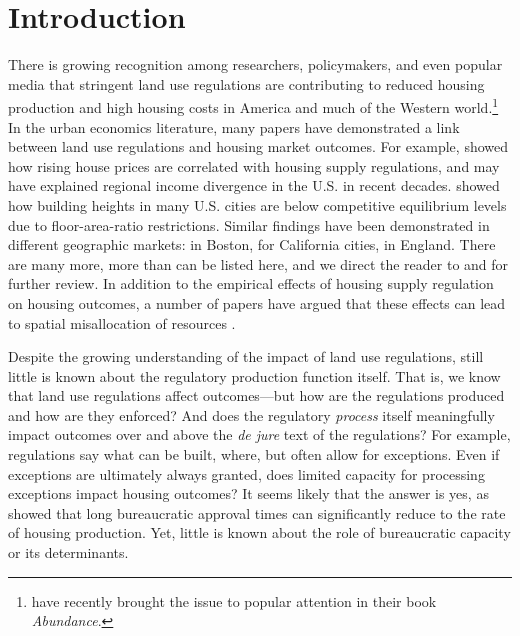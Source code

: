 \section{Introduction}\label{sec_intro}

There is growing recognition among researchers, policymakers, and even popular media that stringent land use regulations are contributing to reduced housing production and high housing costs in America and much of the Western world.\footnote{\citet{klein2025abundance} have recently brought the issue to popular attention in their book \emph{Abundance}.} In the urban economics literature, many papers have demonstrated a link between land use regulations and housing market outcomes. For example, \citet{ganongshoag2017} showed how rising house prices are correlated with housing supply regulations, and may have explained regional income divergence in the U.S. in recent decades. \citet{brueckner2020} showed how building heights in many U.S. cities are below competitive equilibrium levels due to floor-area-ratio restrictions. Similar findings have been demonstrated in different geographic markets: \citet{glaeser2009} in Boston, \citet{jackson2016} for California cities, \citet{hilber2016} in England. There are many more, more than can be listed here, and we direct the reader to \citet{gyourkomolloy2015} and \citet{molloy2020} for further review. In addition to the empirical effects of housing supply regulation on housing outcomes, a number of papers have argued that these effects can lead to spatial misallocation of resources \citep{turner2014, albouy2018, hsieh2019, gabriel2020}. 

Despite the growing understanding of the impact of land use regulations, still little is known about the regulatory production function itself. That is, we know that land use regulations affect outcomes---but how are the regulations produced and how are they enforced? And does the regulatory \emph{process} itself meaningfully impact outcomes over and above the \emph{de jure} text of the regulations? For example, regulations say what can be built, where, but often allow for exceptions. Even if exceptions are ultimately always granted, does limited capacity for processing exceptions impact housing outcomes? It seems likely that the answer is yes, as \citet{gabrielkung2025} showed that long bureaucratic approval times can significantly reduce to the rate of housing production. Yet, little is known about the role of bureaucratic capacity or its determinants.

